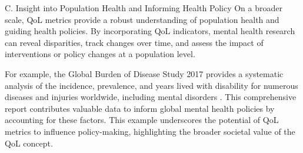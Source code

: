 \documentclass[10pt]{article}
\begin{document}
\begin{sloppypar}
  C. Insight into Population Health and Informing Health Policy
  On a broader scale, QoL metrics provide a robust understanding of population health and guiding health policies. By incorporating QoL indicators, mental health research can reveal disparities, track changes over time, and assess the impact of interventions or policy changes at a population level.

  For example, the Global Burden of Disease Study 2017 provides a systematic analysis of the incidence, prevalence, and years lived with disability for numerous diseases and injuries worldwide, including mental disorders \citep{gbd_2017_disease_and_injury_incidence_and_prevalence_collaborators_global_2018}. This comprehensive report contributes valuable data to inform global mental health policies by accounting for these factors. This example underscores the potential of QoL metrics to influence policy-making, highlighting the broader societal value of the QoL concept.

  \pagebreak
  \singlespacing %
  
  

\end{sloppypar}
\end{document}
